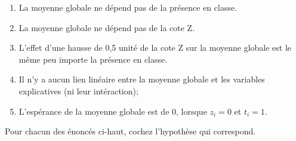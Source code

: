 \begin{questions}
\begin{parts}
\begin{enumerate}
    \item La moyenne globale ne dépend pas de la présence en classe.
    \item La moyenne globale ne dépend pas de la cote Z.
    \item L'effet d'une hausse de 0,5 unité de la cote Z sur la moyenne globale est le même peu importe la présence en classe. 
    \item Il n'y a aucun lien linéaire entre la moyenne globale et les variables explicatives (ni leur intéraction); 
    \item L'espérance de la moyenne globale est de $0$, lorsque $z_i=0$ et $t_i=1$.
\end{enumerate}

\medskip\medskip

 Pour chacun des énoncés ci-haut, cochez l'hypothèse qui correspond.



\end{parts}
\end{questions}
